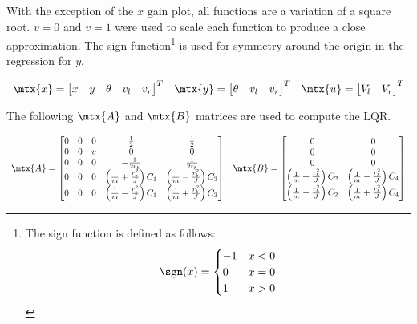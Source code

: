 With the exception of the $x$ gain plot, all functions are a variation of a
square root. $v = 0$ and $v = 1$ were used to scale each function to produce a
close approximation. The sign function\footnote{The sign function is defined as
follows:
\begin{equation*}
  \sgn(x) = \begin{cases}
    -1 & x < 0 \\
    0 & x = 0 \\
    1 & x > 0
  \end{cases}
\end{equation*}} is used for symmetry around the origin in the regression for
$y$.

\begin{theorem}
  \begin{equation*}
    \begin{array}{ccc}
      \mtx{x} =
      \begin{bmatrix}
        x & y & \theta & v_l & v_r
      \end{bmatrix}^T &
      \mtx{y} =
      \begin{bmatrix}
        \theta & v_l & v_r
      \end{bmatrix}^T &
      \mtx{u} =
      \begin{bmatrix}
        V_l & V_r
      \end{bmatrix}^T
    \end{array}
  \end{equation*}

  The following $\mtx{A}$ and $\mtx{B}$ matrices are used to compute the LQR.

  \begin{equation}
    \begin{array}{ll}
      \mtx{A} =
      \begin{bmatrix}
        0 & 0 & 0 & \frac{1}{2} & \frac{1}{2} \\
        0 & 0 & v & 0 & 0 \\
        0 & 0 & 0 & -\frac{1}{2r_b} & \frac{1}{2r_b} \\
        0 & 0 & 0 & \left(\frac{1}{m} + \frac{r_b^2}{J}\right) C_1 &
          \left(\frac{1}{m} - \frac{r_b^2}{J}\right) C_3 \\
        0 & 0 & 0 & \left(\frac{1}{m} - \frac{r_b^2}{J}\right) C_1 &
          \left(\frac{1}{m} + \frac{r_b^2}{J}\right) C_3
      \end{bmatrix} &
      \mtx{B} =
      \begin{bmatrix}
        0 & 0 \\
        0 & 0 \\
        0 & 0 \\
        \left(\frac{1}{m} + \frac{r_b^2}{J}\right) C_2 &
        \left(\frac{1}{m} - \frac{r_b^2}{J}\right) C_4 \\
        \left(\frac{1}{m} - \frac{r_b^2}{J}\right) C_2 &
        \left(\frac{1}{m} + \frac{r_b^2}{J}\right) C_4
      \end{bmatrix}
    \end{array}
  \end{equation}


\end{theorem}
